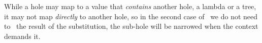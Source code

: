 %
While a hole may map to a value that \emph{contains} another hole, \eg a
lambda or a tree, it may not map \emph{directly} to another hole, so in
the second case of \forcesym\ we do not need to \forcesym\ the result of the
substitution, the sub-hole will be narrowed when the context demands it.

